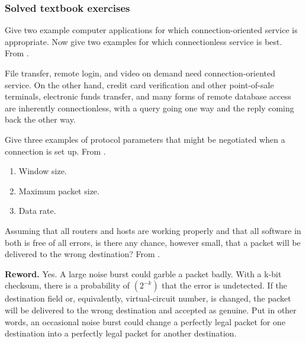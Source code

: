 \documentclass[12pt, oneside]{book}
\begin{document}
\subsubsection{Solved textbook exercises}
\setcounter{Exercise}{0}

\begin{Exercise}
Give two example computer applications for which connection-oriented service is appropriate.
Now give two examples for which connectionless service is best.
From \cite{computer-networks-tanenbaum-2012}.
\end{Exercise}
\begin{Answer}
File transfer, remote login, and video on demand need connection-oriented service.
On the other hand, credit card verification and other point-of-sale terminals, electronic funds transfer, and many forms of remote database access are inherently connectionless, with a query going one way and the reply coming back the other way.
\end{Answer}

\begin{Exercise}
Give three examples of protocol parameters that might be negotiated when a connection is set up.
From \cite{computer-networks-tanenbaum-2012}.
\end{Exercise}
\begin{Answer}
\begin{enumerate}
    \item Window size.
    \item Maximum packet size.
    \item Data rate.
\end{enumerate}
\end{Answer}

\begin{Exercise}
Assuming that all routers and hosts are working properly and that all software in both is free of all errors, is there any chance, however small, that a packet will be delivered to the wrong destination?
From \cite{computer-networks-tanenbaum-2012}.
\end{Exercise}
\begin{Answer}
\textbf{Reword.}
Yes. A large noise burst could garble a packet badly.
With a k-bit checksum, there is a probability of \((2^{-k})\) that the error is undetected.
If the destination field or, equivalently, virtual-circuit number, is changed, the packet will be delivered to the wrong destination and accepted as genuine. Put in other words, an occasional noise burst could change a perfectly legal packet for one destination into a perfectly legal packet for another destination.
\end{Answer}
\end{document}
